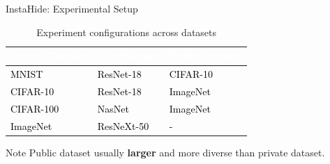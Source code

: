 \documentclass[xcolor=table]{beamer} %
\begin{document}

\begin{frame}{InstaHide: Experimental Setup}
    \centering
    \renewcommand{\arraystretch}{1.8} 
    \setlength{\arrayrulewidth}{1.2pt} 
    \begin{small}
    \begin{table}
    \begin{tabular}{p{2.8cm}  p{3.2cm}  p{3.5cm}}
        \hline
        \rowcolor{UNBCGreen} 
        \textcolor{white}{\textbf{Private Dataset}} & 
        \textcolor{white}{\textbf{Architecture}} & 
        \textcolor{white}{\textbf{Public Dataset}} \\
        \hline
        \textcolor{black}{MNIST}           & \textcolor{black}{ResNet-18}           & \textcolor{black}{CIFAR-10}           \\ \hline
        \textcolor{black}{CIFAR-10}        & \textcolor{black}{ResNet-18}           & \textcolor{black}{ImageNet}           \\ \hline
        \textcolor{black}{CIFAR-100}       & \textcolor{black}{NasNet}              & \textcolor{black}{ImageNet}           \\ \hline
        \textcolor{black}{ImageNet}        & \textcolor{black}{ResNeXt-50}          & \textcolor{black}{-}           \\ \hline
    \end{tabular}
    \caption{Experiment configurations across datasets}
    \end{table}
    \end{small}
    \pause
    \begin{block}{Note}
        Public dataset usually \textbf{larger} and more diverse than private dataset.
    \end{block}
\end{frame}
\end{document}
